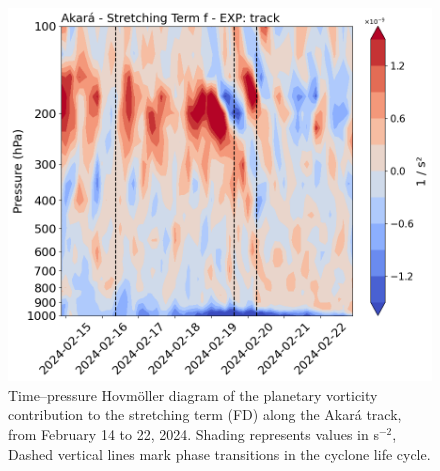 \documentclass[pdflatex,sn-chicago]{sn-jnl}%
\theoremstyle{plain}
\theoremstyle{definition}
\theoremstyle{remark}
\theoremstyle{definition}
\begin{document}
\begin{figure}[!htbp]
    \centering
    \includegraphics[width=\textwidth]{fDivH_hov.png}
    \caption{Time–pressure Hovmöller diagram of the planetary vorticity contribution to the stretching term (FD) along the Akará track, from February 14 to 22, 2024. Shading represents values in s$^{-2}$, Dashed vertical lines mark phase transitions in the cyclone life cycle.}
    \label{fig:fDivH_hov}
\end{figure}

\end{document}
